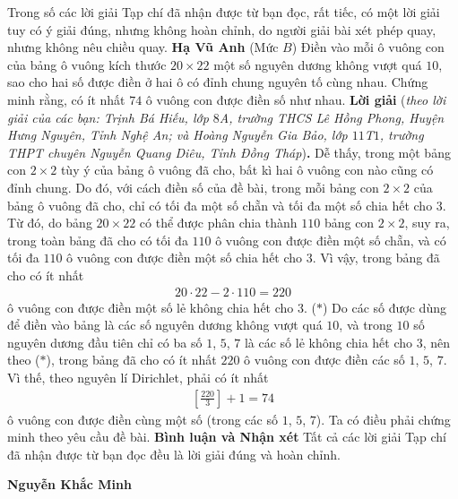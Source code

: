 \begin{multicols}{2}
	\vskip 0.05cm
	Trong số các lời giải Tạp chí đã nhận được từ bạn đọc, rất tiếc, có một lời giải tuy có ý giải đúng, nhưng không hoàn chỉnh, do người giải bài xét phép quay, nhưng không nêu chiều quay.
	\vskip 0.05cm
	\hfill	\textbf{\color{thachthuctoanhoc}Hạ Vũ Anh}
	\vskip 0.05cm
	{}
	(Mức $B$) Điền vào mỗi ô vuông con của bảng ô vuông kích thước $20\times 22$ một số nguyên dương không vượt quá $10$, sao cho hai số được điền ở hai ô có đỉnh chung nguyên tố cùng nhau. Chứng minh rằng, có ít nhất $74$ ô vuông con được điền số như nhau.
	\vskip 0.05cm
	\textbf{\color{thachthuctoanhoc}Lời giải} (\textit{theo lời giải của các bạn: Trịnh Bá Hiếu, lớp $8$A, trường THCS Lê Hồng Phong, Huyện Hưng Nguyên, Tỉnh Nghệ An; và Hoàng Nguyễn Gia Bảo, lớp $11$T$1$, trường THPT chuyên Nguyễn Quang Diêu, Tỉnh Đồng Tháp})\textbf{\color{thachthuctoanhoc}.}
	\vskip 0.05cm
	Dễ thấy, trong một bảng con $2 \times 2$ tùy ý của bảng ô vuông đã cho, bất kì hai ô vuông con nào cũng có đỉnh chung. Do đó, với cách điền số của đề bài, trong mỗi bảng con $2 \times 2$ của bảng ô vuông đã cho, chỉ có tối đa một số chẵn và tối đa một số chia hết cho $3$.
	\vskip 0.05cm
	Từ đó, do bảng $20 \times 22$ có thể được phân chia thành $110$ bảng con $2 \times 2$, suy ra, trong toàn bảng đã cho có tối đa $110$ ô vuông con được điền một số chẵn, và có tối đa $110$ ô vuông con được điền một số chia hết cho $3$. Vì vậy, trong bảng đã cho có ít nhất
	\begin{align*}
		20 \cdot 22 - 2 \cdot 110 = 220
	\end{align*}
	ô vuông con được điền một số lẻ không chia hết cho $3$. \hfill ($*$)
	\vskip 0.05cm
	Do các số được dùng để điền vào bảng là các số nguyên dương không vượt quá $10$, và trong $10$ số nguyên dương đầu tiên chỉ có ba số $1$, $5$, $7$ là các số lẻ không chia hết cho $3$, nên theo ($*$), trong bảng đã cho có ít nhất $220$ ô vuông con được điền các số $1$, $5$, $7$. Vì thế, theo nguyên lí Dirichlet, phải có ít nhất
	\begin{align*}
		\left[ {\frac{{220}}{3}} \right] + 1 = 74
	\end{align*}
	ô vuông con được điền cùng một số (trong các số $1$, $5$, $7$).
	\vskip 0.05cm
	Ta có điều phải chứng minh theo yêu cầu đề bài.
	\vskip 0.05cm
	\textbf{\color{thachthuctoanhoc}Bình luận và Nhận xét}
	\vskip 0.05cm
	Tất cả các lời giải Tạp chí đã nhận được từ bạn đọc đều là lời giải đúng và hoàn chỉnh.
	\begin{flushright}
		\textbf{\color{thachthuctoanhoc}Nguyễn Khắc Minh}

\end{flushright}
\end{multicols}
